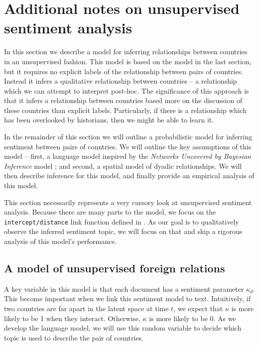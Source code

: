 \section{Additional notes on unsupervised sentiment analysis}
\label{sec:app_unsupervised_sentiment}

In this section we describe a model for inferring relationships between countries in an unsupervised fashion.  This model is based on the model in the last section, but it requires no explicit labels of the relationship between pairs of countries.  Instead it infers a qualitative relationship between countries -- a relationship which we can attempt to interpret post-hoc.  The significance of this approach is that it infers a relationship between countries based more on the discussion of these countries than explicit labels.  Particularly, if there is a relationship which has been overlooked by historians, then we might be able to learn it.

In the remainder of this section we will outline a probabilistic model
for inferring sentiment between pairs of countries.  We will outline
the key assumptions of this model -- first, a language model inspired
by the \emph{Networks Uncovered by Bayesian Inference} model
\citep{chang:2009nubbi}; and second, a spatial model of dyadic
relationships. We will then describe inference for this model, and
finally provide an empirical analysis of this model.

This section necessarily represents a very cursory look at
unsupervised sentiment analysis.  Because there are many parts to the
model, we focus on the \verb!intercept/distance! link function defined
in .  As our goal is to qualitatively observe
the inferred sentiment topic, we will focus on that and skip a
rigorous analysis of this model's performance.

\subsection{A model of unsupervised foreign relations}

A key variable in this model is that each document has a sentiment parameter $\kappa_d$.  This become important when we link this sentiment model to text.  Intuitively, if two countries are far apart in the latent space at time $t$, we expect that $\kappa$ is more likely to be 1 when they interact.  Otherwise, $\kappa$ is more likely to be 0.  As we develop the language model, we will use this random variable to decide which topic is used to describe the pair of countries.


